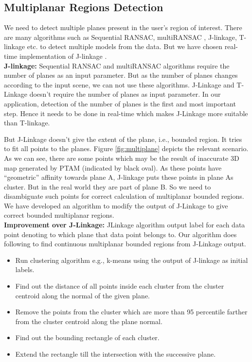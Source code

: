 \subsection{Multiplanar Regions Detection}
We need to detect multiple planes present in the user's region of
interest. There are many algorithms such as Sequential RANSAC\cite{Kanazawa},
multiRANSAC\cite{zuliani} , J-linkage\cite{jlinkage}, T-linkage\cite{tlinkage}
etc. to detect multiple models from the data. But we have chosen real-time
implementation of J-linkage \cite{realtimejlinkage}.\\
\textbf{J-linkage:} Sequential RANSAC and multiRANSAC algorithms require
the number of planes as an input parameter. But as the number of planes changes
according to the input scene, we can not use these algorithms. J-Linkage and T-Linkage
doesn't require the number of planes as input parameter. 
In our application, detection of the number of planes is the first and most
important step. Hence it needs to be done in real-time which makes J-Linkage
more suitable than T-linkage.

But J-Linkage doesn't give the extent of the plane, i.e., bounded
region. It tries to fit all points to the planes. Figure \ref{fig:multiplane}
depicts the relevant scenario. As we can see, there are some points which may
be the result of inaccurate 3D map generated by PTAM (indicated by black oval).
As these points have ``geometric'' affinity towards plane A, J-linkage puts these
points in plane A\textquotesingle s cluster. But in the real world they are part
of plane B.
So we need to disambiguate such points for correct calculation of multiplanar
bounded regions. We have developed an algorithm to modify the output of
J-Linkage to give correct bounded multiplanar regions.\\
\textbf{Improvement over J-Linkage:} JLinkage algorithm output label
for each data point denoting to which plane that data point belongs to. Our
algorithm does following to find continuous multiplanar bounded regions from J-Linkage
output.
\begin{itemize}
  \item Run clustering algorithm e.g., k-means using the output of J-linkage
  as initial labels.
  \item Find out the distance of all points inside each cluster from the cluster
  centroid along the normal of the given plane.
  \item Remove the points from the cluster which are more than 95 percentile
  farther from the cluster centroid along the plane normal.
  \item Find out the bounding rectangle of each cluster.
  \item Extend the rectangle till the intersection with the successive plane.
\end{itemize}

